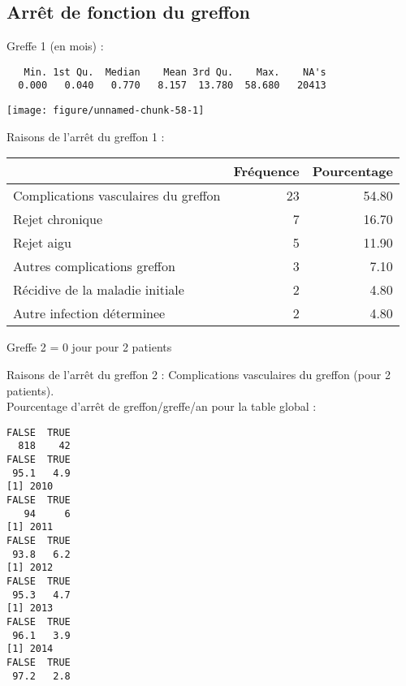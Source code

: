 \documentclass[11pt,a4paper]{article}\usepackage[]{graphicx}\usepackage[]{color}
\makeatletter
\def\maxwidth{ %
  \ifdim\Gin@nat@width>\linewidth
    \linewidth
  \else
    \Gin@nat@width
  \fi
}
\newenvironment{kframe}{%
 \def\at@end@of@kframe{}%
 \ifinner\ifhmode%
  \def\at@end@of@kframe{\end{minipage}}%
  \begin{minipage}{\columnwidth}%
 \fi\fi%
 \def\FrameCommand##1{\hskip\@totalleftmargin \hskip-\fboxsep
 \colorbox{shadecolor}{##1}\hskip-\fboxsep
     \hskip-\linewidth \hskip-\@totalleftmargin \hskip\columnwidth}%
 \MakeFramed {\advance\hsize-\width
   \@totalleftmargin\z@ \linewidth\hsize
   \@setminipage}}%
 {\par\unskip\endMakeFramed%
 \at@end@of@kframe}
\newenvironment{knitrout}{}{} %
\makeatother
\begin{document}
  \subsection{Arrêt de fonction du greffon}

Greffe 1 (en mois) :
  
\begin{knitrout}
\color{fgcolor}\begin{kframe}
\begin{verbatim}
   Min. 1st Qu.  Median    Mean 3rd Qu.    Max.    NA's 
  0.000   0.040   0.770   8.157  13.780  58.680   20413 
\end{verbatim}
\end{kframe}
\texttt{[image: figure/unnamed-chunk-58-1]} 

\end{knitrout}

Raisons de l'arrêt du greffon 1 :
\begin{table}[H]
\centering
\begin{tabular}{lrr}
  \hline
 & Fréquence & Pourcentage \\ 
  \hline
Complications vasculaires du greffon &  23 & 54.80 \\ 
  Rejet chronique &   7 & 16.70 \\ 
  Rejet aigu &   5 & 11.90 \\ 
  Autres complications greffon &   3 & 7.10 \\ 
  Récidive de la maladie initiale &   2 & 4.80 \\ 
  Autre infection déterminee &   2 & 4.80 \\ 
   \hline
\end{tabular}
\end{table}


Greffe 2 = 0 jour pour 2 patients

Raisons de l'arrêt du greffon 2 : Complications vasculaires du greffon  (pour 2 patients).
~\\

Pourcentage d'arrêt de greffon/greffe/an pour la table global :

\begin{knitrout}
\color{fgcolor}\begin{kframe}
\begin{verbatim}
FALSE  TRUE 
  818    42 
FALSE  TRUE 
 95.1   4.9 
[1] 2010
FALSE  TRUE 
   94     6 
[1] 2011
FALSE  TRUE 
 93.8   6.2 
[1] 2012
FALSE  TRUE 
 95.3   4.7 
[1] 2013
FALSE  TRUE 
 96.1   3.9 
[1] 2014
FALSE  TRUE 
 97.2   2.8 
\end{verbatim}
\end{kframe}
\end{knitrout}
\end{document}
